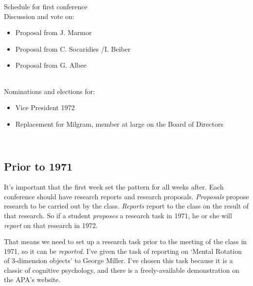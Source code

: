 \begin{refsection}
\begin{apatextbox}{Schedule for first conference}
\\

Discussion and vote on: \\

\begin{itemize}
\item Proposal from J. Marmor

\item Proposal from C. Socaridies \slash  I. Beiber

\item Proposal from G. Albee

\end{itemize}

\\Nominations and elections for:\\

\begin{itemize}
\item Vice President 1972

\item Replacement for Milgram, member at large on the Board of Directors

\end{itemize}

\\

\label{sample:firstconference}
 \end{apatextbox}


 

\newpage

\subsection{Prior to 1971}
\label{priorto1971}

It’s important that the first week set the pattern for all weeks after. Each conference should have research reports and research proposals. \emph{Proposals} propose research to be carried out by the class. \emph{Reports} report to the class on the result of that research. So if a student \emph{proposes} a research task in 1971, he or she will \emph{report} on that research in 1972.

That means we need to set up a research task prior to the meeting of the class in 1971, so it can be \emph{reported}. I’ve given the task of reporting on ‘Mental Rotation of 3-dimension objects’ to George Miller. I’ve chosen this task because it is a classic of cognitive psychology, and there is a freely-available demonstration on the APA’s website.


\end{refsection}
